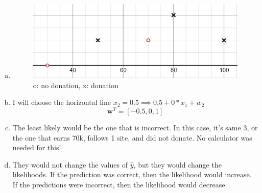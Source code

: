 \documentclass[12pt]{article}
\begin{document}
\section{}
\begin{enumerate}[(a)]
	\item 
	\begin{figure}[H]
		\centering
		\includegraphics{images/6a.png}
		\caption{o: no donation, x: donation}
		\label{figure:6b}
	\end{figure}

	\item I will choose the horizontal line $ x_2 = 0.5 \implies 0.5 +0 * x_1 + w_2$
	\[ \mathbf{w}^T = [-0.5, 0, 1] \]
	
	\item The least likely would be the one that is incorrect. In this case, it's same 3, or the one that earns 70k, follows 1 site, and did not donate. No calculator was needed for this!
	
	\item They would not change the values of $ \hat{y} $, but they would change the likelihoods. If the prediction was correct, then the likelihood would increase. If the predictions were incorrect, then the likelihood would decrease.
\end{enumerate}
\end{document}
